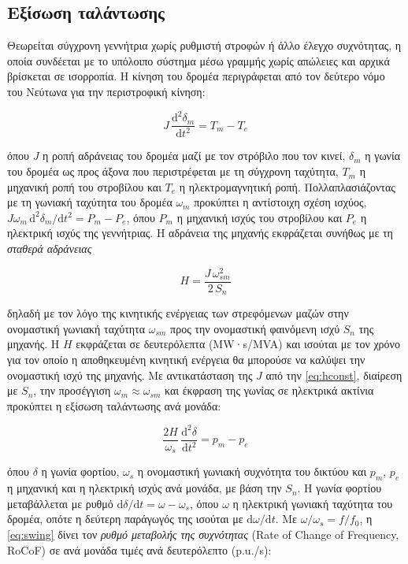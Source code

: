 \subsection{Εξίσωση ταλάντωσης}
\label{sec:swing}

Θεωρείται σύγχρονη γεννήτρια χωρίς ρυθμιστή στροφών ή άλλο έλεγχο συχνότητας, η οποία
συνδέεται με το υπόλοιπο σύστημα μέσω γραμμής χωρίς απώλειες και αρχικά βρίσκεται σε
ισορροπία. Η κίνηση του δρομέα περιγράφεται από τον δεύτερο νόμο του Νεύτωνα για την
περιστροφική κίνηση:

\begin{equation}
J\,\frac{\mathrm{d}^2\delta_m}{\mathrm{d}t^2} = T_m - T_e
\label{eq:swing-torque}
\end{equation}

όπου $J$ η ροπή αδράνειας του δρομέα μαζί με τον στρόβιλο που τον κινεί, $\delta_m$ η γωνία
του δρομέα ως προς άξονα που περιστρέφεται με τη σύγχρονη ταχύτητα, $T_m$ η μηχανική ροπή του
στροβίλου και $T_e$ η ηλεκτρομαγνητική ροπή. Πολλαπλασιάζοντας με τη γωνιακή ταχύτητα του
δρομέα $\omega_m$ προκύπτει η αντίστοιχη σχέση ισχύος,
$J\omega_m\,\mathrm{d}^2\delta_m/\mathrm{d}t^2 = P_m - P_e$, όπου $P_m$ η μηχανική ισχύς του
στροβίλου και $P_e$ η ηλεκτρική ισχύς της γεννήτριας. Η αδράνεια της μηχανής εκφράζεται
συνήθως με τη \emph{σταθερά αδράνειας}

\begin{equation}
H = \frac{J\,\omega_{sm}^2}{2\,S_n}
\label{eq:hconst}
\end{equation}

δηλαδή με τον λόγο της κινητικής ενέργειας των στρεφόμενων μαζών στην ονομαστική γωνιακή
ταχύτητα $\omega_{sm}$ προς την ονομαστική φαινόμενη ισχύ $S_n$ της μηχανής. Η $H$ εκφράζεται
σε δευτερόλεπτα (MW·s/MVA) και ισούται με τον χρόνο για τον οποίο η αποθηκευμένη κινητική
ενέργεια θα μπορούσε να καλύψει την ονομαστική ισχύ της μηχανής. Με αντικατάσταση της $J$ από
την \eqref{eq:hconst}, διαίρεση με $S_n$, την προσέγγιση $\omega_m \approx \omega_{sm}$ και
έκφραση της γωνίας σε ηλεκτρικά ακτίνια προκύπτει η εξίσωση ταλάντωσης ανά μονάδα:

\begin{equation}
\frac{2H}{\omega_s}\,\frac{\mathrm{d}^2\delta}{\mathrm{d}t^2} = p_m - p_e
\label{eq:swing}
\end{equation}

όπου $\delta$ η γωνία φορτίου, $\omega_s$ η ονομαστική γωνιακή συχνότητα του δικτύου και
$p_m$, $p_e$ η μηχανική και η ηλεκτρική ισχύς ανά μονάδα, με βάση την $S_n$. Η γωνία φορτίου
μεταβάλλεται με ρυθμό $\mathrm{d}\delta/\mathrm{d}t = \omega - \omega_s$, όπου $\omega$ η
ηλεκτρική γωνιακή ταχύτητα του δρομέα, οπότε η δεύτερη παράγωγός της ισούται με
$\mathrm{d}\omega/\mathrm{d}t$. Με $\omega/\omega_s = f/f_0$, η \eqref{eq:swing} δίνει τον
\emph{ρυθμό μεταβολής της συχνότητας} (Rate of Change of Frequency, RoCoF) σε ανά μονάδα
τιμές ανά δευτερόλεπτο (p.u./s):

